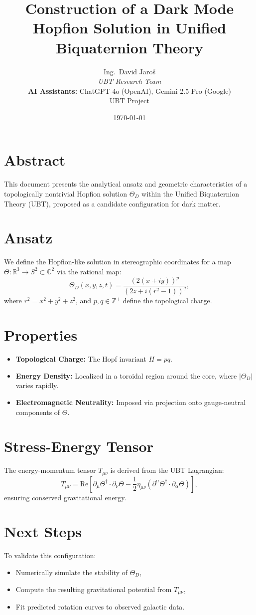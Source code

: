 \documentclass[12pt]{article}
\title{Construction of a Dark Mode Hopfion Solution in Unified Biquaternion Theory}
\author{
Ing.~David Jaroš \\
\textit{UBT Research Team} \\
\textbf{AI Assistants:} ChatGPT-4o (OpenAI), Gemini 2.5 Pro (Google) \\
UBT Project}
\date{\today}
\begin{document}
\maketitle

\section*{Abstract}
This document presents the analytical ansatz and geometric characteristics of a topologically nontrivial Hopfion solution \(\Theta_D\) within the Unified Biquaternion Theory (UBT), proposed as a candidate configuration for dark matter.

\section{Ansatz}
We define the Hopfion-like solution in stereographic coordinates for a map \( \Theta : \mathbb{R}^3 \to S^2 \subset \mathbb{C}^2 \) via the rational map:
\[
\Theta_D(x, y, z, t) = \frac{(2(x+iy))^p}{(2z + i(r^2 - 1))^q},
\]
where \( r^2 = x^2 + y^2 + z^2 \), and \(p, q \in \mathbb{Z}^+\) define the topological charge.

\section{Properties}
\begin{itemize}
    \item \textbf{Topological Charge:} The Hopf invariant \(H = pq\).
    \item \textbf{Energy Density:} Localized in a toroidal region around the core, where \(|\Theta_D|\) varies rapidly.
    \item \textbf{Electromagnetic Neutrality:} Imposed via projection onto gauge-neutral components of \(\Theta\).
\end{itemize}

\section{Stress-Energy Tensor}
The energy-momentum tensor \(T_{\mu\nu}\) is derived from the UBT Lagrangian:
\[
T_{\mu\nu} = \text{Re} \left[ \partial_\mu \Theta^\dagger \cdot \partial_\nu \Theta - \frac{1}{2} \eta_{\mu\nu} \left( \partial^\alpha \Theta^\dagger \cdot \partial_\alpha \Theta \right) \right],
\]
ensuring conserved gravitational energy.

\section{Next Steps}
To validate this configuration:
\begin{itemize}
    \item Numerically simulate the stability of \(\Theta_D\),
    \item Compute the resulting gravitational potential from \(T_{\mu\nu}\),
    \item Fit predicted rotation curves to observed galactic data.
\end{itemize}
\end{document}
